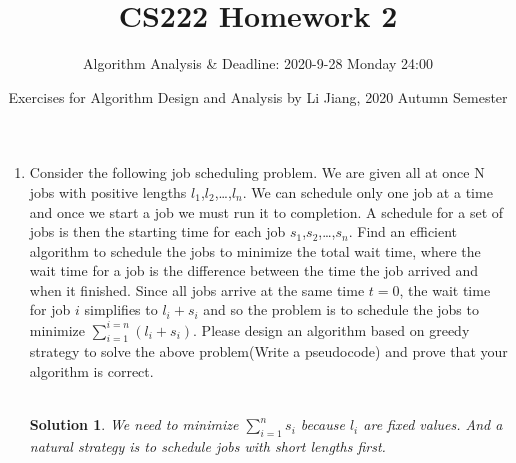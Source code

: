 \documentclass{article}
\title{CS222 Homework 2}
\author{Algorithm Analysis \& Deadline: 2020-9-28 Monday 24:00}
\date{Exercises for Algorithm Design and Analysis by Li Jiang, 2020 Autumn Semester}
\newtheorem*{solution}{Solution}
\begin{document}
\maketitle

\begin{enumerate}

\item Consider the following job scheduling problem. We are given all at once N jobs with positive lengths $l_1$,$l_2$,…,$l_n$. We can schedule only one job at a time and once we start a job we must run it to completion. A schedule for a set of jobs is then the starting time for each job $s_1$,$s_2$,…,$s_n$. Find an efficient algorithm to schedule the jobs to minimize the total wait time, where the wait time for a job is the difference between the time the job arrived and when it finished. Since all jobs arrive at the same time $t=0$, the wait time for job $i$ simplifies to $l_i+s_i$ and so the problem is to schedule the jobs to minimize $\sum _{i=1}^{i=n} (l_i + s_i)$. Please design an algorithm based on greedy strategy to solve the above problem(Write a pseudocode) and prove that your algorithm is correct.\\

~\\
\begin{solution}
    We need to minimize $\sum_{i=1}^n s_i$ because $l_i$ are fixed values. And a natural strategy is to schedule jobs with short lengths first.\\
    \begin{minipage}[t]{0.8\textwidth}
        \begin{algorithm}[H]
    

\end{algorithm}
\end{minipage}
\end{solution}
\end{enumerate}
\end{document}
